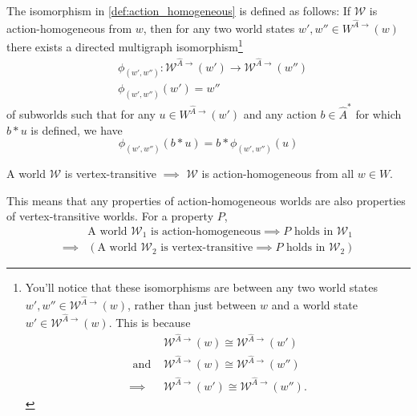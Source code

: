The isomorphism in \cref{def:action_homogeneous} is defined as follows:
If $\mathscr{W}$ is action-homogeneous from $w$, then for any two world states $w', w'' \in W^{\hat{A}\to}(w)$ there exists a directed multigraph isomorphism\footnote{
You'll notice that these isomorphisms are between any two world states $w', w'' \in \mathscr{W}^{\hat{A}\to}(w)$, rather than just between $w$ and a world state $w' \in \mathscr{W}^{\hat{A}\to}(w)$.
This is because
\begin{align}
        & \mathscr{W}^{\hat{A}\to}(w) \cong \mathscr{W}^{\hat{A}\to}(w') \\
        \text{ and } &  \mathscr{W}^{\hat{A}\to}(w) \cong \mathscr{W}^{\hat{A}\to}(w'') \\
    \implies & \mathscr{W}^{\hat{A}\to}(w') \cong \mathscr{W}^{\hat{A}\to}(w'').
\end{align}
}
\begin{align}
    & \phi_{(w', w'')}: \mathscr{W}^{\hat{A}\to}(w') \to \mathscr{W}^{\hat{A}\to}(w'') \\
    & \phi_{(w', w'')}(w') = w''
\end{align}
of subworlds such that for any $u \in W^{\hat{A}\to}(w')$ and any action $b \in \hat{A}^{*}$ for which $b \ast u$ is defined, we have
\begin{equation}
    \phi_{(w', w'')}(b \ast u) = b \ast \phi_{(w', w'')}(u)
\end{equation}

\begin{corollary}
    A world $\mathscr{W}$ is vertex-transitive $\implies$ $\mathscr{W}$ is action-homogeneous from all $w \in W$.
\end{corollary}

This means that any properties of action-homogeneous worlds are also properties of vertex-transitive worlds.
For a property $P$,
\begin{align}
    & \text{A world $\mathscr{W}_{1}$ is action-homogeneous} \implies \text{$P$ holds in $\mathscr{W}_{1}$} \\
    \implies & (\text{A world $\mathscr{W}_{2}$ is vertex-transitive} \implies \text{$P$ holds in $\mathscr{W}_{2}$})
\end{align}



